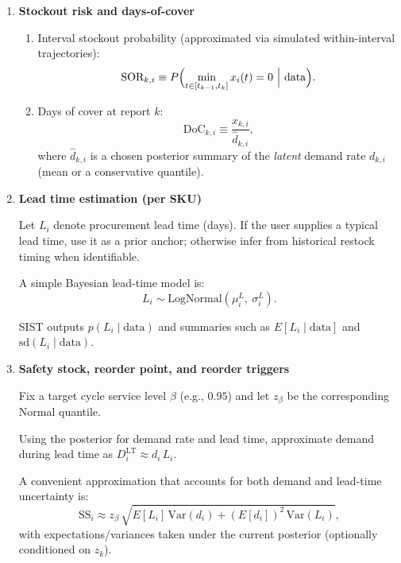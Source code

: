 \documentclass[11pt]{article}
\begin{document}
\begin{enumerate}
  SIST outputs (optionally regime-conditional by $z_k$):
  \begin{enumerate}
    \item $E[d_{k,i}\mid\text{data}]$ and credible intervals for $d_{k,i}$.
    \item Short-horizon forecast distribution for demand rate $d_{k+1,i}$ from drift/seasonality dynamics.
  \end{enumerate}

  \item \textbf{Stockout risk and days-of-cover}
  \begin{enumerate}
    \item Interval stockout probability (approximated via simulated within-interval trajectories):
    \[
      \text{SOR}_{k,i} \equiv P\Bigl(\min_{t\in[t_{k-1},t_k]} x_i(t)=0\ \Big|\ \text{data}\Bigr).
    \]
    \item Days of cover at report $k$:
    \[
      \text{DoC}_{k,i} \equiv \frac{x_{k,i}}{\hat d_{k,i}},
    \]
    where $\hat d_{k,i}$ is a chosen posterior summary of the \emph{latent} demand rate $d_{k,i}$ (mean or a conservative quantile).
  \end{enumerate}

  \item \textbf{Lead time estimation (per SKU)}

  Let $L_i$ denote procurement lead time (days). If the user supplies a typical lead time,
  use it as a prior anchor; otherwise infer from historical restock timing when identifiable.

  A simple Bayesian lead-time model is:
  \[
    L_i \sim \text{LogNormal}(\mu^{L}_i,\ \sigma^{L}_i).
  \]

  SIST outputs $p(L_i\mid\text{data})$ and summaries such as $E[L_i\mid\text{data}]$ and $\mathrm{sd}(L_i\mid\text{data})$.

  \item \textbf{Safety stock, reorder point, and reorder triggers}

  Fix a target cycle service level $\beta$ (e.g., $0.95$) and let $z_{\beta}$ be the corresponding Normal quantile.

  Using the posterior for demand rate and lead time, approximate demand during lead time as
  $D^{\mathrm{LT}}_i \approx d_i\,L_i$.

  A convenient approximation that accounts for both demand and lead-time uncertainty is:
  \[
    \text{SS}_i \approx z_{\beta}\,\sqrt{E[L_i]\,\mathrm{Var}(d_i) + (E[d_i])^2\,\mathrm{Var}(L_i)},
  \]
  with expectations/variances taken under the current posterior (optionally conditioned on $z_k$).


\end{enumerate}
\end{document}
